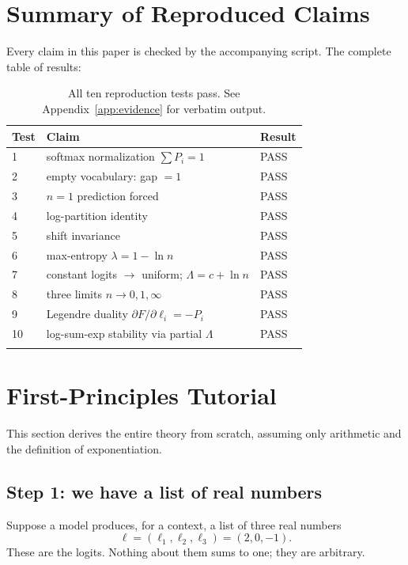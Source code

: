 \documentclass[11pt]{article}
\begin{document}
\section{Summary of Reproduced Claims}
\label{sec:summary}

Every claim in this paper is checked by the accompanying script. The complete
table of results:

\begin{longtable}{@{}lp{3cm}l@{}}
\toprule
Test & Claim & Result \\
\midrule
1 & softmax normalization $\sum P_i=1$ & PASS \\
2 & empty vocabulary: gap $=1$ & PASS \\
3 & $n=1$ prediction forced & PASS \\
4 & log-partition identity & PASS \\
5 & shift invariance & PASS \\
6 & max-entropy $\lambda=1-\ln n$ & PASS \\
7 & constant logits $\to$ uniform; $\Lambda=c+\ln n$ & PASS \\
8 & three limits $n\to0,1,\infty$ & PASS \\
9 & Legendre duality $\partial F/\partial\ell_i=-P_i$ & PASS \\
10 & log-sum-exp stability via partial $\Lambda$ & PASS \\
\bottomrule
\caption{All ten reproduction tests pass. See Appendix~\ref{app:evidence} for
verbatim output.}
\label{tab:summary}
\end{longtable}

\section{First-Principles Tutorial}
\label{sec:tutorial}

This section derives the entire theory from scratch, assuming only arithmetic
and the definition of exponentiation.

\subsection{Step 1: we have a list of real numbers}
\label{sec:tut-1}

Suppose a model produces, for a context, a list of three real numbers
\[
\ell = (\ell_1,\ell_2,\ell_3) = (2, 0, -1).
\]
These are the logits. Nothing about them sums to one; they are arbitrary.
\end{document}
